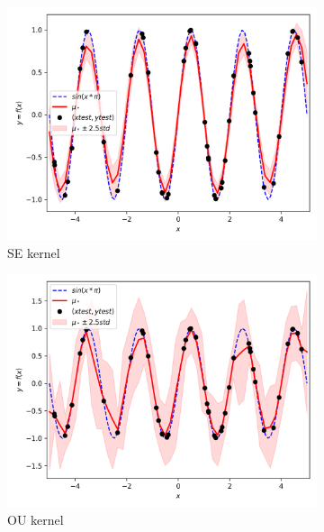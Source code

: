 \documentclass{article}
\begin{document}
\begin{figure}[ht]
  \begin{subfigure}{.5\textwidth}
    \centering
    \includegraphics[width=\linewidth]{kernels/posterior/kernelSE.png}
    \caption{SE kernel}
    \label{fig:kernelSE50}
  \end{subfigure}
  \begin{subfigure}{.5\textwidth}
    \centering
    \includegraphics[width=\linewidth]{kernels/posterior/kernelOU.png}
    \caption{OU kernel }
    \label{fig:kernelOU50}
  \end{subfigure}
  \begin{subfigure}{.5\textwidth}
    \centering

\end{subfigure}
\end{figure}
\end{document}
